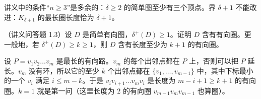 \begin{remark}
讲义中的条件“$n\geqslant3$”是多余的：$\delta\geqslant2$ 的简单图至少有三个顶点。界 $\delta+1$ 不能改进：$K_{\delta+1}$ 的最长圈长度恰为 $\delta+1$。
\end{remark}

\begin{workedexample}\label{we:longest-paths:digraph-cycle}
（讲义问答题 1.3）设 $D$ 是简单有向图，$\delta^+(D)\geqslant1$。证明 $D$ 含有有向圈。更一般地，若 $\delta^+(D)\geqslant k\geqslant1$，则 $D$ 含有长度至少为 $k+1$ 的有向圈。
\end{workedexample}
\begin{solution}
设 $P=v_1v_2\dots v_m$ 是最长的有向路。$v_m$ 的每个出邻点都在 $P$ 上，否则可以把 $P$ 延长。$v_m$ 没有环，所以它的至少 $k$ 个出邻点都在 $\{v_1,\dots,v_{m-1}\}$ 中，其中下标最小的一个 $v_i$ 满足 $i\leqslant m-k$。于是 $v_iv_{i+1}\dots v_mv_i$ 是长度为 $m-i+1\geqslant k+1$ 的有向圈。$k=1$ 就是第一问（这里长度为 $2$ 的有向圈 $v_{m-1}v_mv_{m-1}$ 也算圈）。
\end{solution}

